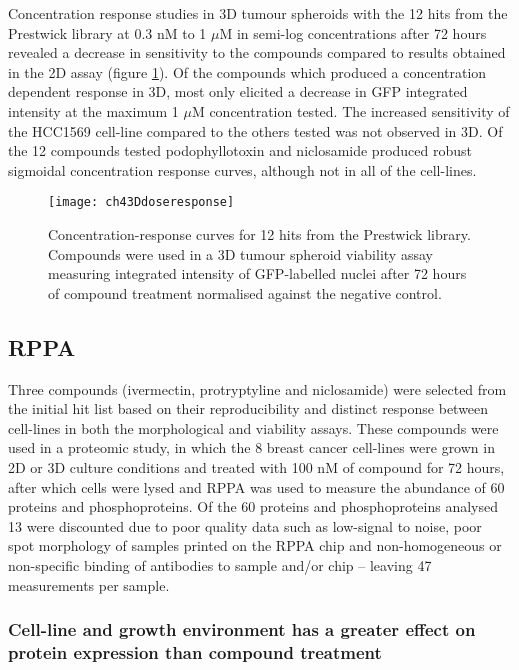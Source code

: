 \documentclass[a4paper,11pt,twoside,openright]{scrbook}
\begin{document}
Concentration response studies in 3D tumour spheroids with the 12 hits from the Prestwick library at 0.3 nM to 1 $\mu$M 
in semi-log concentrations after 72 hours revealed a decrease in sensitivity to the compounds compared to results 
obtained in the 2D assay (figure \ref{figure:3D_dose_response}).
Of the compounds which produced a concentration dependent response in 3D, most only elicited a decrease in GFP 
integrated intensity at the maximum 1 $\mu$M concentration tested.
The increased sensitivity of the HCC1569 cell-line compared to the others tested was not observed in 3D.
Of the 12 compounds tested podophyllotoxin and niclosamide produced robust sigmoidal concentration response curves, 
although not in all of the cell-lines.

\begin{figure}
    \texttt{[image: ch43Ddoseresponse]}
    \captionsetup{width=0.8\textwidth}
    \caption[Concentration-response curves for 12 hits from the Prestwick library.]{
        Concentration-response curves for 12 hits from the Prestwick library.
        Compounds were used in a 3D tumour spheroid viability assay measuring integrated intensity of GFP-labelled 
nuclei after 72 hours of compound treatment normalised against the negative control.
    }
    \label{figure:3D_dose_response}
\end{figure}


\subsection{RPPA}

Three compounds (ivermectin, protryptyline and niclosamide) were selected from the initial hit list based on their 
reproducibility and distinct response between cell-lines in both the morphological and viability assays.
These compounds were used in a proteomic study, in which the 8 breast cancer cell-lines were grown in 2D or 3D culture 
conditions and treated with 100 nM of compound for 72 hours, after which cells were lysed and RPPA was used to measure 
the abundance of 60 proteins and phosphoproteins.
Of the 60 proteins and phosphoproteins analysed 13 were discounted due to poor quality data such as low-signal to 
noise, poor spot morphology of samples printed on the RPPA chip and non-homogeneous or non-specific binding of 
antibodies to sample and/or chip -- leaving 47 measurements per sample.


\subsubsection{Cell-line and growth environment has a greater effect on protein expression than compound treatment}
\end{document}

